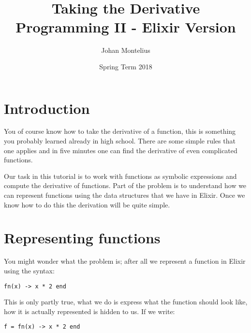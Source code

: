\documentclass[a4paper,11pt]{article}
\begin{document}

\title{
    \textbf{Taking the Derivative}\\
    \large{Programming II - Elixir Version}
}
\author{Johan Montelius}
\date{Spring Term 2018}
\maketitle
{}



\section*{Introduction}

You of course know how to take the derivative of a function, this is
something you probably learned already in high school. There are some
simple rules that one applies and in five minutes one can find the
derivative of even complicated functions.

Our task in this tutorial is to work with functions as symbolic
expressions and compute the derivative of functions. Part of the
problem is to understand how we can represent functions using the data
structures that we have in Elixir. Once we know how to do this the
derivation will be quite simple.  



\section{Representing functions}

You might wonder what the problem is; after all we represent a function in Elixir using the syntax:

\begin{verbatim}
fn(x) -> x * 2 end
\end{verbatim}

This is only partly true, what we do is express what the function
should look like, how it is actually represented is hidden to us.
If we write:

\begin{verbatim}
f = fn(x) -> x * 2 end
\end{verbatim}
\end{document}
